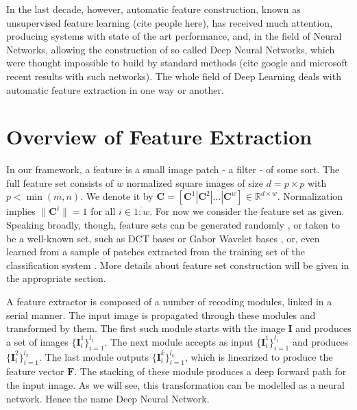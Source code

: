 \documentclass[12pt,a4paper,oneside,english]{UPBThesis}
\newcommand{\hctimes}[2]{{#1}\!\times\!{#2}}
\newcommand{\hcrange}[2]{\overline{{#1}\colon\!\!{#2}}}
\begin{document}
In the last decade, however, automatic feature construction, known as unsupervised feature learning (cite people here), has received much attention, producing systems with state of the art performance, and, in the field of Neural Networks, allowing the construction of so called Deep Neural Networks, which were thought impossible to build by standard methods (cite google and microsoft recent results with such networks). The whole field of Deep Learning deals with automatic feature extraction in one way or another.

\chapter{Overview of Feature Extraction}
\label{chap:OverviewFeatureExtraction}

In our framework, a feature is a small image patch - a filter - of some sort. The full feature set consists of $w$ normalized square images of size $d = \hctimes{p}{p}$ with $p < \min(m,n)$. We denote it by $\textbf{C} = \left[ \textbf{C}^1 \left|\right. \textbf{C}^2 \left|\right. \dots \left|\right. \textbf{C}^w \right] \in \mathbb{R}^{\hctimes{d}{w}}$. Normalization implies $\|\mathbf{C}^i\| = 1$ for all $i \in \hcrange{1}{w}$. For now we consider the feature set as given. Speaking broadly, though, feature sets can be generated randomly \cite{random-weights-feature-learning}, or taken to be a well-known set, such as DCT bases or Gabor Wavelet bases \cite{simple-method-sparse-coding}, or, even learned from a sample of patches extracted from the training set of the classification system \cite{emergence-sparse-coding,sparse-coding-strategy-V1,tiny-images}. More details about feature set construction will be given in the appropriate section.

A feature extractor is composed of a number of recoding modules, linked in a serial manner. The input image is propagated through these modules and transformed by them. The first such module starts with the image $\textbf{I}$ and produces a set of images $\{\textbf{I}_i^1\}_{i=1}^{l_1}$. The next module accepts as input $\{\textbf{I}_i^1\}_{i=1}^{l_1}$ and produces $\{\textbf{I}_i^2\}_{i=1}^{l_2}$. The last module outputs $\{\textbf{I}_i^k\}_{i=1}^{l_k}$, which is linearized to produce the feature vector $\mathbf{F}$. The stacking of these module produces a deep forward path for the input image. As we will see, this transformation can be modelled as a neural network. Hence the name Deep Neural Network. 
\end{document}
